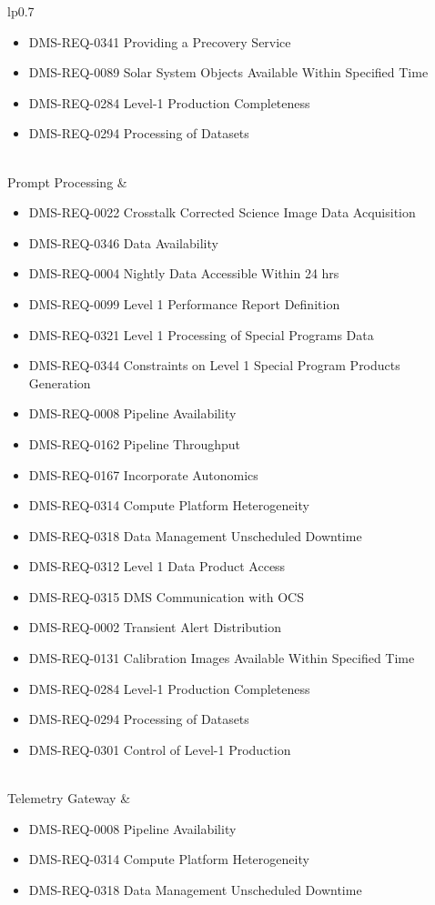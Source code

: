\begin{xtabular}{lp{0.7\textwidth}}
\begin{itemize}
\item DMS-REQ-0341 Providing a Precovery Service
\item DMS-REQ-0089 Solar System Objects Available Within Specified Time
\item DMS-REQ-0284 Level-1 Production Completeness
\item DMS-REQ-0294 Processing of Datasets
\end{itemize} \\ \hline
Prompt Processing &
\begin{itemize}
\item DMS-REQ-0022 Crosstalk Corrected Science Image Data Acquisition
\item DMS-REQ-0346 Data Availability
\item DMS-REQ-0004 Nightly Data Accessible Within 24 hrs
\item DMS-REQ-0099 Level 1 Performance Report Definition
\item DMS-REQ-0321 Level 1 Processing of Special Programs Data
\item DMS-REQ-0344 Constraints on Level 1 Special Program Products Generation
\item DMS-REQ-0008 Pipeline Availability
\item DMS-REQ-0162 Pipeline Throughput
\item DMS-REQ-0167 Incorporate Autonomics
\item DMS-REQ-0314 Compute Platform Heterogeneity
\item DMS-REQ-0318 Data Management Unscheduled Downtime
\item DMS-REQ-0312 Level 1 Data Product Access
\item DMS-REQ-0315 DMS Communication with OCS
\item DMS-REQ-0002 Transient Alert Distribution
\item DMS-REQ-0131 Calibration Images Available Within Specified Time
\item DMS-REQ-0284 Level-1 Production Completeness
\item DMS-REQ-0294 Processing of Datasets
\item DMS-REQ-0301 Control of Level-1 Production
\end{itemize} \\ \hline
Telemetry Gateway &
\begin{itemize}
\item DMS-REQ-0008 Pipeline Availability
\item DMS-REQ-0314 Compute Platform Heterogeneity
\item DMS-REQ-0318 Data Management Unscheduled Downtime

\end{itemize}
\end{xtabular}
